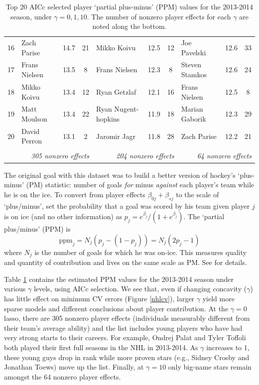 \documentclass[12pt]{article}
\newcommand{\mr}[1]{\mathrm{#1}}
\begin{document}
\begin{table}[tb]
{\begin{tabular}{l|lcc|lcc|lcc|}
16 & Zach Parise & 14.7 & 21 & Mikko Koivu & 12.5 & 12 & Joe Pavelski & 12.6 & 33 \\
17 & Frans Nielsen & 13.5 & 8 & Frans Nielsen & 12.3 & 8 & Steven Stamkos & 12.6 & 24 \\
18 & Mikko Koivu & 13.4 & 12 & Ryan Getzlaf & 12.1 & 16 & Frans Nielsen & 12.5 & 8 \\
19 & Matt Moulson & 13.4 & 22 & Ryan Nugent-hopkins & 11.9 & 18 & Marian Gaborik & 12.3 & 29 \\
20 & David Perron & 13.1 & 2 & Jaromir Jagr & 11.8 & 28 & Zach Parise & 12.2 & 21 \\
\multicolumn{1}{c}{} & \multicolumn{3}{r|}{} & \multicolumn{3}{r|}{} &  \multicolumn{3}{r|}{}\\
 \multicolumn{1}{c}{} & \multicolumn{3}{r|}{\it 305 nonzero effects} & \multicolumn{3}{r|}{\it 204 nonzero effects} &  \multicolumn{3}{r|}{\it 64 nonzero effects}
\end{tabular}}
\caption{\label{nhleffects} Top 20 AICc selected player `partial plus-minus' (PPM) values for the 2013-2014 season, under $\gamma = 0,1,10$.  The number of nonzero player effects for each $\gamma$ are noted along the bottom.}
\end{table}


The original goal with this dataset was to build a better version of
hockey's `plus-minus' (PM) statistic: number of goals {\it for} minus {\it
against} each player's team while he is on the ice. To convert from player
effects $\beta_{0j} + \beta_{sj}$ to the scale of `plus/minus', set the probability that a goal was scored by his team given player
$j$ is on ice  (and no other information) as $p_j = e^{\beta_j}/(1+e^{\beta_j})$. The `partial
plus/minus' (PPM) is 
\begin{equation}
 \mr{ppm}_j = N_j(p_j - (1-p_j)) = N_j(2p_j-1)
 \end{equation}  where
$N_j$ is the  number of goals for which he was on-ice.  This measures 
quality and quantity of contribution and lives on the same scale as PM.  See \cite{gramacy_hockey_2015} for details.

Table \ref{nhleffects} contains the estimated PPM values for the 2013-2014
season under various $\gamma$ levels, using AICc selection.  We see that, even
if changing concavity ($\gamma$) has little effect on minimum CV errors (Figure \ref{nhlcv}),
larger $\gamma$  yield more sparse models and different conclusions about
player contribution. At the $\gamma=0$ lasso, there are 305 nonzero player
effects (individuals measurably different from their team's average ability)
and the list includes young players who have had very strong starts to their
careers.  For example, Ondrej Palat and Tyler Toffoli both played their first
full seasons in the NHL in 2013-2014.  As $\gamma$ increases to 1, these young
guys  drop in rank while more proven stars (e.g., Sidney Crosby and Jonathan
Toews) move up the list.  Finally, at $\gamma=10$ only big-name stars remain
amongst the 64 nonzero player effects.
\end{document}
